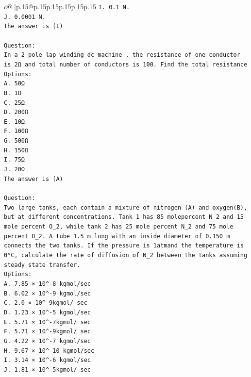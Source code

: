 \documentclass{article}
\begin{document}
{\begin{supertabular}{c@{$\;$}|p{.15\linewidth}@{}p{.15\linewidth}p{.15\linewidth}p{.15\linewidth}p{.15\linewidth}p{.15\linewidth}}
{{{\texttt{I. 0.1 N.} \\
\texttt{J. 0.0001 N.} \\
\texttt{The answer is (I)} \\
\\ 
\texttt{Question:} \\
\texttt{In a 2 pole lap winding dc machine , the resistance of one conductor is 2Ω and total number of conductors is 100. Find the total resistance} \\
\texttt{Options:} \\
\texttt{A. 50Ω} \\
\texttt{B. 1Ω} \\
\texttt{C. 25Ω} \\
\texttt{D. 200Ω} \\
\texttt{E. 10Ω} \\
\texttt{F. 100Ω} \\
\texttt{G. 500Ω} \\
\texttt{H. 150Ω} \\
\texttt{I. 75Ω} \\
\texttt{J. 20Ω} \\
\texttt{The answer is (A)} \\
\\ 
\texttt{Question:} \\
\texttt{Two large tanks, each contain a mixture of nitrogen (A) and oxygen(B), but at different concentrations. Tank 1 has 85 molepercent N\_2 and 15 mole percent O\_2, while tank 2 has 25 mole percent N\_2 and 75 mole percent O\_2. A tube 1.5 m long with an inside diameter of 0.150 m connects the two tanks. If the pressure is 1atmand the temperature is 0°C, calculate the rate of diffusion of N\_2 between the tanks assuming steady state transfer.} \\
\texttt{Options:} \\
\texttt{A. 7.85 × 10\^{}{-}8 kgmol/sec} \\
\texttt{B. 6.02 × 10\^{}{-}9 kgmol/sec} \\
\texttt{C. 2.0 × 10\^{}{-}9kgmol/ sec} \\
\texttt{D. 1.23 × 10\^{}{-}5 kgmol/sec} \\
\texttt{E. 5.71 × 10\^{}{-}7kgmol/ sec} \\
\texttt{F. 5.71 × 10\^{}{-}9kgmol/ sec} \\
\texttt{G. 4.22 × 10\^{}{-}7 kgmol/sec} \\
\texttt{H. 9.67 × 10\^{}{-}10 kgmol/sec} \\
\texttt{I. 3.14 × 10\^{}{-}6 kgmol/sec} \\
\texttt{J. 1.81 × 10\^{}{-}5kgmol/ sec} \\
            }
        }
    }
     \\ \\


\end{supertabular}}
\end{document}

